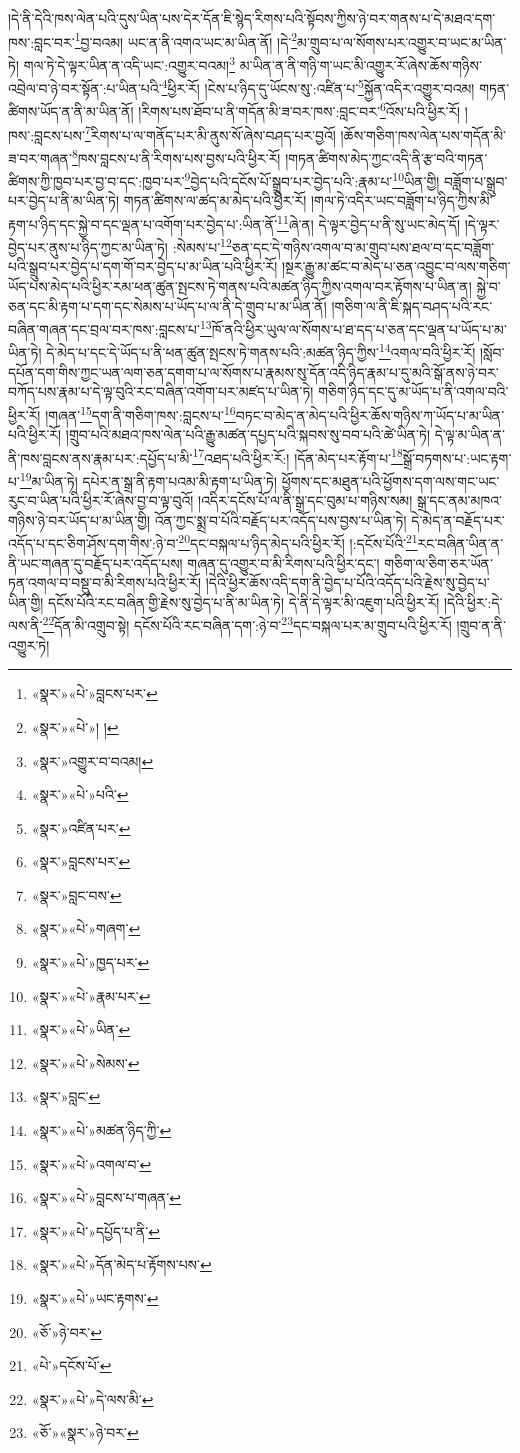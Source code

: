 །དེ་ནི་དེའི་ཁས་ལེན་པའི་དུས་ཡིན་པས་དེར་དོན་ཇི་སྙེད་རིགས་པའི་སྟོབས་ཀྱིས་ཉེ་བར་གནས་པ་དེ་མཐའ་དག་ཁས་:བླང་བར་\footnote{«སྣར་»«པེ་»བླངས་པར་}བྱ་བའམ། ཡང་ན་ནི་འགའ་ཡང་མ་ཡིན་ནོ། །དེ་\footnote{«སྣར་»«པེ་»། །}མ་གྲུབ་པ་ལ་སོགས་པར་འགྱུར་བ་ཡང་མ་ཡིན་ཏེ། གལ་ཏེ་དེ་ལྟར་ཡིན་ན་འདི་ཡང་:འགྱུར་བའམ།\footnote{«སྣར་»འགྱུར་བ་བའམ།} མ་ཡིན་ན་ནི་གཉི་ག་ཡང་མི་འགྱུར་རོ་ཞེས་ཆོས་གཉིས་འབྲེལ་བ་ཉེ་བར་སྟོན་:པ་ཡིན་པའི་\footnote{«སྣར་»«པེ་»པའི་}ཕྱིར་རོ། །ངེས་པ་ཉིད་དུ་ཡོངས་སུ་:འཛིན་པ་\footnote{«སྣར་»འཛིན་པར་}སྐྱོན་འདིར་འགྱུར་བའམ། གཏན་ཚིགས་ཡོད་ན་ནི་མ་ཡིན་ནོ། །རིགས་པས་ཐོབ་པ་ནི་གདོན་མི་ཟ་བར་ཁས་:བླང་བར་\footnote{«སྣར་»བླངས་པར་}འོས་པའི་ཕྱིར་རོ། །ཁས་:བླངས་པས་\footnote{«སྣར་»བླང་བས་}རིགས་པ་ལ་གནོད་པར་མི་ནུས་སོ་ཞེས་བཤད་པར་བྱའོ། །ཆོས་གཅིག་ཁས་ལེན་པས་གདོན་མི་ཟ་བར་གཞན་\footnote{«སྣར་»«པེ་»གཞག་}ཁས་བླངས་པ་ནི་རིགས་པས་བྱས་པའི་ཕྱིར་རོ། །གཏན་ཚིགས་མེད་ཀྱང་འདི་ནི་རྩ་བའི་གཏན་ཚིགས་ཀྱི་ཁྱབ་པར་བྱ་བ་དང་:ཁྱབ་པར་\footnote{«སྣར་»«པེ་»ཁྱད་པར་}བྱེད་པའི་དངོས་པོ་སྒྲུབ་པར་བྱེད་པའི་:རྣམ་པ་\footnote{«སྣར་»«པེ་»རྣམ་པར་}ཡིན་གྱི། བཟློག་པ་སྒྲུབ་པར་བྱེད་པ་ནི་མ་ཡིན་ཏེ། གཏན་ཚིགས་ལ་ཚད་མ་མེད་པའི་ཕྱིར་རོ། །གལ་ཏེ་འདིར་ཡང་བཟློག་པ་ཉིད་ཀྱིས་མི་རྟག་པ་ཉིད་དང་སྐྱེ་བ་དང་ལྡན་པ་འགོག་པར་བྱེད་པ་:ཡིན་ནོ་\footnote{«སྣར་»«པེ་»ཡིན་}ཞེ་ན། དེ་ལྟར་བྱེད་པ་ནི་སུ་ཡང་མེད་དོ། །དེ་ལྟར་བྱེད་པར་ནུས་པ་ཉིད་ཀྱང་མ་ཡིན་ཏེ། :སེམས་པ་\footnote{«སྣར་»«པེ་»སེམས་}ཅན་དང་དེ་གཉིས་འགལ་བ་མ་གྲུབ་པས་ཐལ་བ་དང་བཟློག་པའི་སྒྲུབ་པར་བྱེད་པ་དག་གོ་བར་བྱེད་པ་མ་ཡིན་པའི་ཕྱིར་རོ། །སྔར་རྒྱུ་མ་ཚང་བ་མེད་པ་ཅན་འབྱུང་བ་ལས་གཅིག་ཡོད་པས་མེད་པའི་ཕྱིར་རམ་ཕན་ཚུན་སྤངས་ཏེ་གནས་པའི་མཚན་ཉིད་ཀྱིས་འགལ་བར་རྟོགས་པ་ཡིན་ན། སྐྱེ་བ་ཅན་དང་མི་རྟག་པ་དག་དང་སེམས་པ་ཡོད་པ་ལ་ནི་དེ་གྲུབ་པ་མ་ཡིན་ནོ། །གཅིག་ལ་ནི་ཇི་སྐད་བཤད་པའི་རང་བཞིན་གཞན་དང་བྲལ་བར་ཁས་:བླངས་པ་\footnote{«སྣར་»བླང་}ཁོ་ནའི་ཕྱིར་ཡུལ་ལ་སོགས་པ་ཐ་དད་པ་ཅན་དང་ལྡན་པ་ཡོད་པ་མ་ཡིན་ཏེ། དེ་མེད་པ་དང་དེ་ཡོད་པ་ནི་ཕན་ཚུན་སྤངས་ཏེ་གནས་པའི་:མཚན་ཉིད་ཀྱིས་\footnote{«སྣར་»«པེ་»མཚན་ཉིད་ཀྱི་}འགལ་བའི་ཕྱིར་རོ། །སློབ་དཔོན་དག་གིས་ཀྱང་ཡན་ལག་ཅན་དགག་པ་ལ་སོགས་པ་རྣམས་སུ་དོན་འདི་ཉིད་རྣམ་པ་དུ་མའི་སྒོ་ནས་ཉེ་བར་བཀོད་པས་རྣམ་པ་དེ་ལྟ་བུའི་རང་བཞིན་འགོག་པར་མཛད་པ་ཡིན་ཏེ། གཅིག་ཉིད་དང་དུ་མ་ཡོད་པ་ནི་འགལ་བའི་ཕྱིར་རོ། །གཞན་\footnote{«སྣར་»«པེ་»འགལ་བ་}དག་ནི་གཅིག་ཁས་:བླངས་པ་\footnote{«སྣར་»«པེ་»བླངས་པ་གཞན་}བཏང་བ་མེད་ན་མེད་པའི་ཕྱིར་ཆོས་གཉིས་ཀ་ཡོད་པ་མ་ཡིན་པའི་ཕྱིར་རོ། །གྲུབ་པའི་མཐའ་ཁས་ལེན་པའི་རྒྱུ་མཚན་དཔྱད་པའི་སྐབས་སུ་བབ་པའི་ཚེ་ཡིན་ཏེ། དེ་ལྟ་མ་ཡིན་ན་ནི་ཁས་བླངས་ནས་རྣམ་པར་:དཔྱོད་པ་མི་\footnote{«སྣར་»«པེ་»དཔྱོད་པ་ནི་}འཐད་པའི་ཕྱིར་རོ:། །དོན་མེད་པར་རྟོག་པ་\footnote{«སྣར་»«པེ་»དོན་མེད་པ་རྟོགས་པས་}སྒྲོ་བཏགས་པ་:ཡང་རྟག་པ་\footnote{«སྣར་»«པེ་»ཡང་རྟགས་}མ་ཡིན་ཏེ། དཔེར་ན་སྒྲ་ནི་རྟག་པའམ་མི་རྟག་པ་ཡིན་ཏེ། ཕྱོགས་དང་མཐུན་པའི་ཕྱོགས་དག་ལས་གང་ཡང་རུང་བ་ཡིན་པའི་ཕྱིར་རོ་ཞེས་བྱ་བ་ལྟ་བུའོ། །འདིར་དངོས་པོ་ལ་ནི་སྒྲ་དང་བུམ་པ་གཉིས་སམ། སྒྲ་དང་ནམ་མཁའ་གཉིས་ཉེ་བར་ཡོད་པ་མ་ཡིན་གྱི། འོན་ཀྱང་སྨྲ་བ་པོའི་བརྗོད་པར་འདོད་པས་བྱས་པ་ཡིན་ཏེ། དེ་མེད་ན་བརྗོད་པར་འདོད་པ་དང་ཅིག་ཤོས་དག་གིས་:ཉེ་བ་\footnote{«ཅོ་»ཉེ་བར་}དང་བསྐལ་པ་ཉིད་མེད་པའི་ཕྱིར་རོ། །:དངོས་པོའི་\footnote{«པེ་»དངོས་པོ་}རང་བཞིན་ཡིན་ན་ནི་ཡང་གཞན་དུ་བརྗོད་པར་འདོད་པས། གཞན་དུ་འགྱུར་བ་མི་རིགས་པའི་ཕྱིར་དང་། གཅིག་ལ་ཅིག་ཅར་ཡོན་ཏན་འགལ་བ་བསྡུ་བ་མི་རིགས་པའི་ཕྱིར་རོ། །དེའི་ཕྱིར་ཆོས་འདི་དག་ནི་བྱེད་པ་པོའི་འདོད་པའི་རྗེས་སུ་བྱེད་པ་ཡིན་གྱི། དངོས་པོའི་རང་བཞིན་གྱི་རྗེས་སུ་བྱེད་པ་ནི་མ་ཡིན་ཏེ། དེ་ནི་དེ་ལྟར་མི་འཇུག་པའི་ཕྱིར་རོ། །དེའི་ཕྱིར་:དེ་ལས་ནི་\footnote{«སྣར་»«པེ་»དེ་ལས་མི་}དོན་མི་འགྲུབ་སྟེ། དངོས་པོའི་རང་བཞིན་དག་:ཉེ་བ་\footnote{«ཅོ་»«སྣར་»ཉེ་བར་}དང་བསྐལ་པར་མ་གྲུབ་པའི་ཕྱིར་རོ། །གྲུབ་ན་ནི་འགྱུར་ཏེ། 